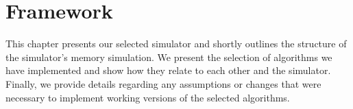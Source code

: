 \chapter{Framework}
\label{cpt:framework}

This chapter presents our selected simulator and shortly outlines the structure of the simulator's memory simulation.
We present the selection of algorithms we have implemented and show how they relate to each other and the simulator.
Finally, we provide details regarding any assumptions or changes that were necessary to implement working versions of the selected algorithms.






